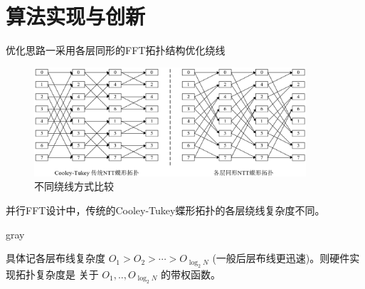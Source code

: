 \documentclass[8pt]{ctexbeamer}
\renewenvironment{quote}
{
	\begin{notebox}{gray}
}
{
	\end{notebox}
}
\begin{document}
\section{算法实现与创新}

\begin{frame}{优化思路一}{采用各层同形的FFT拓扑结构优化绕线}

	\begin{center}
		\begin{figure}
			\includegraphics[width=0.9\textwidth]{figure/Figure1.NTT_Topology.png}
			\caption{不同绕线方式比较}
			\label{fig:FFTComparison}
		\end{figure}
	\end{center}

	并行FFT设计中，传统的Cooley-Tukey蝶形拓扑的各层绕线复杂度不同。
	\begin{quote}
		具体记各层布线复杂度 $O_1 > O_2 >\cdots > O_{\log_2 N}$ (一般后层布线更迅速)。则硬件实现拓扑复杂度是
		关于 $O_1,..,O_{\log_2 N}$ 的带权函数。
	\end{quote}
\end{frame}
\end{document}
